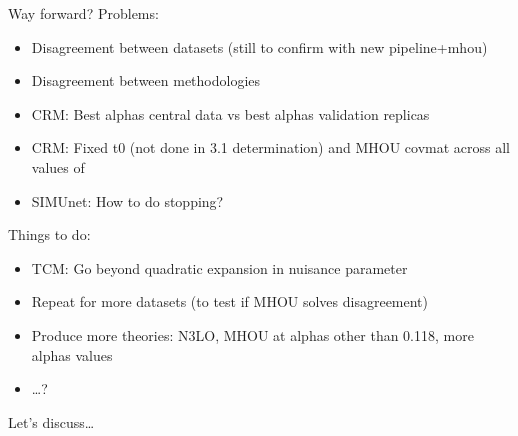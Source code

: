 \documentclass[aspectratio=169, 8pt,t]{beamer}
\begin{document}
\begin{frame}{Way forward?}
  Problems:
  \begin{itemize}
    \item Disagreement between datasets (still to confirm with new pipeline+mhou)
    \item Disagreement between methodologies
    \item CRM: Best alphas central data vs best alphas validation replicas
    \item CRM: Fixed t0 (not done in 3.1 determination) and MHOU covmat across all values of
    \item SIMUnet: How to do stopping?
  \end{itemize}

  Things to do:
  \begin{itemize}
    \item TCM: Go beyond quadratic expansion in nuisance parameter
    \item Repeat for more datasets (to test if MHOU solves disagreement)
    \item Produce more theories: N3LO, MHOU at alphas other than 0.118, more alphas values
    \item \ldots?
  \end{itemize}

  Let's discuss\ldots
\end{frame}
\end{document}
